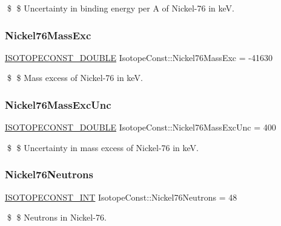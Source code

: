 \$ \$ Uncertainty in binding energy per A of Nickel-\/76 in keV. \mbox{\label{group___isotope_const-_nickel-_ni76_gad846888f1b21f50af18c71d8b6942255}} 
\subsubsection{\texorpdfstring{Nickel76\+Mass\+Exc}{Nickel76MassExc}}
{\footnotesize\ttfamily \mbox{\hyperlink{group___isotope_const-_macros_ga8f45a7272ce02c0b4c65c44636ed719a}{I\+S\+O\+T\+O\+P\+E\+C\+O\+N\+S\+T\+\_\+\+D\+O\+U\+B\+LE}} Isotope\+Const\+::\+Nickel76\+Mass\+Exc = -\/41630}

\$ \$ Mass excess of Nickel-\/76 in keV. \mbox{\label{group___isotope_const-_nickel-_ni76_ga839859a082bd70ec40dd01a853d2f4f3}} 
\subsubsection{\texorpdfstring{Nickel76\+Mass\+Exc\+Unc}{Nickel76MassExcUnc}}
{\footnotesize\ttfamily \mbox{\hyperlink{group___isotope_const-_macros_ga8f45a7272ce02c0b4c65c44636ed719a}{I\+S\+O\+T\+O\+P\+E\+C\+O\+N\+S\+T\+\_\+\+D\+O\+U\+B\+LE}} Isotope\+Const\+::\+Nickel76\+Mass\+Exc\+Unc = 400}

\$ \$ Uncertainty in mass excess of Nickel-\/76 in keV. \mbox{\label{group___isotope_const-_nickel-_ni76_gab5372fe87662ad8bc7b01dda99e43bc6}} 
\subsubsection{\texorpdfstring{Nickel76\+Neutrons}{Nickel76Neutrons}}
{\footnotesize\ttfamily \mbox{\hyperlink{group___isotope_const-_macros_ga5f18360b3e99483a35c32d789e62621c}{I\+S\+O\+T\+O\+P\+E\+C\+O\+N\+S\+T\+\_\+\+I\+NT}} Isotope\+Const\+::\+Nickel76\+Neutrons = 48}

\$ \$ Neutrons in Nickel-\/76. \mbox{\label{group___isotope_const-_nickel-_ni76_ga26051024f55a95f757f0adf7bec91d83}} 
